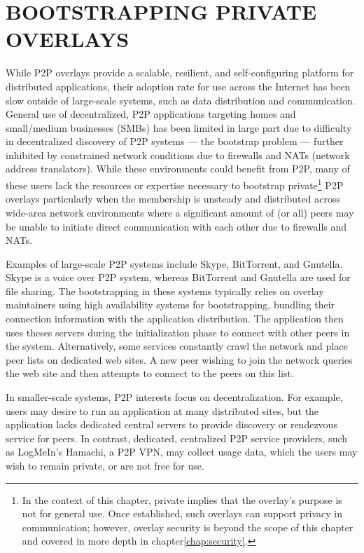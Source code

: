 \chapter{BOOTSTRAPPING PRIVATE OVERLAYS}
\label{chap:bootstrapping}

While P2P overlays provide a scalable, resilient, and self-configuring platform
for distributed applications, their adoption rate for use across the Internet
has been slow outside of large-scale systems, such as data distribution and
communication.  General use of decentralized, P2P applications targeting homes
and small/medium businesses (SMBs) has been limited in large part due to
difficulty in decentralized discovery of P2P systems --- the bootstrap problem
--- further inhibited by constrained network conditions due to firewalls and
NATs (network address translators).  While these environments could benefit
from P2P, many of these users lack the resources or expertise necessary to
bootstrap private\footnote{In the context of this chapter, private implies that
the overlay's purpose is not for general use. Once established, such overlays
can support privacy in communication; however, overlay security is beyond the
scope of this chapter and covered in more depth in chapter\ref{chap:security}.}
P2P overlays particularly when the membership is unsteady and distributed
across wide-area network environments where a significant amount of (or all)
peers may be unable to initiate direct communication with each other due to
firewalls and NATs.

Examples of large-scale P2P systems include Skype, BitTorrent, and Gnutella.
Skype is a voice over P2P system, whereas BitTorrent and Gnutella are used for
file sharing.  The bootstrapping in these systems typically relies on overlay
maintainers using high availability systems for bootstrapping, bundling their
connection information with the application distribution.  The application then
uses theses servers during the initialization phase to connect with other peers
in the system.  Alternatively, some services constantly crawl the network and
place peer lists on dedicated web sites. A new peer wishing to join the network
queries the web site and then attempts to connect to the peers on this list.

In smaller-scale systems, P2P interests focus on decentralization.  For
example, users may desire to run an application at many distributed sites, but
the application lacks dedicated central servers to provide discovery or
rendezvous service for peers.  In contrast, dedicated, centralized P2P service
providers, such as LogMeIn's Hamachi, a P2P VPN, may collect usage data, which
the users may wish to remain private, or are not free for use.

